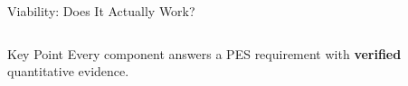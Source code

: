 \documentclass[aspectratio=169,11pt]{beamer}
\begin{document}
\begin{frame}[shrink=10]{Viability: Does It Actually Work?}
\begin{columns}
        \vspace{0.1cm}
        \begin{block}{Key Point}
            \small
            Every component answers a PES requirement with \textbf{verified} quantitative evidence.
        \end{block}
        
        \vspace{0.05cm}
    \end{columns}
\end{frame}
\end{document}
